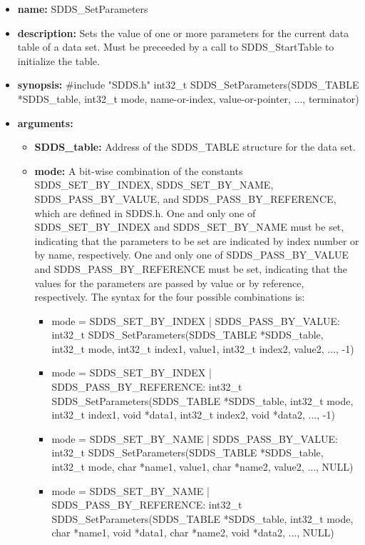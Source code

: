 \documentclass[11pt]{article}
\begin{document}
\begin{itemize}
\item {\bf name:}\newline
SDDS\_SetParameters
\item {\bf description:}\newline
Sets the value of one or more parameters for the current data table of a data set. Must be preceeded by a call to SDDS\_StartTable to initialize the table.
\item {\bf synopsis:} \#include "SDDS.h"\newline
int32\_t SDDS\_SetParameters(SDDS\_TABLE *SDDS\_table, int32\_t mode,  name-or-index,  value-or-pointer, ...,  terminator)
\item {\bf arguments:}
\begin{itemize}
\item {\bf SDDS\_table:} Address of the SDDS\_TABLE structure for the data set.
\item {\bf mode:} A bit-wise combination of the constants SDDS\_SET\_BY\_INDEX, SDDS\_SET\_BY\_NAME, SDDS\_PASS\_BY\_VALUE, and SDDS\_PASS\_BY\_REFERENCE, which are defined in  SDDS.h. One and only one of SDDS\_SET\_BY\_INDEX and SDDS\_SET\_BY\_NAME must be set, indicating that the parameters to be set are indicated by index number or by name, respectively. One and only one of SDDS\_PASS\_BY\_VALUE and SDDS\_PASS\_BY\_REFERENCE must be set, indicating that the values for the parameters are passed by value or by reference, respectively. The syntax for the four possible combinations is:
\begin{itemize}
\item mode = SDDS\_SET\_BY\_INDEX | SDDS\_PASS\_BY\_VALUE: int32\_t SDDS\_SetParameters(SDDS\_TABLE *SDDS\_table, int32\_t mode, int32\_t index1,  value1, int32\_t index2,  value2, ..., -1)
\item mode = SDDS\_SET\_BY\_INDEX | SDDS\_PASS\_BY\_REFERENCE: int32\_t SDDS\_SetParameters(SDDS\_TABLE *SDDS\_table, int32\_t mode, int32\_t index1, void *data1, int32\_t index2, void *data2, ..., -1)
\item mode = SDDS\_SET\_BY\_NAME | SDDS\_PASS\_BY\_VALUE: int32\_t SDDS\_SetParameters(SDDS\_TABLE *SDDS\_table, int32\_t mode, char *name1,  value1, char *name2,  value2, ..., NULL)
\item mode = SDDS\_SET\_BY\_NAME | SDDS\_PASS\_BY\_REFERENCE: int32\_t SDDS\_SetParameters(SDDS\_TABLE *SDDS\_table, int32\_t mode, char *name1, void *data1, char *name2, void *data2, ..., NULL)  
\end{itemize}

\end{itemize}
\end{itemize}
\end{document}
